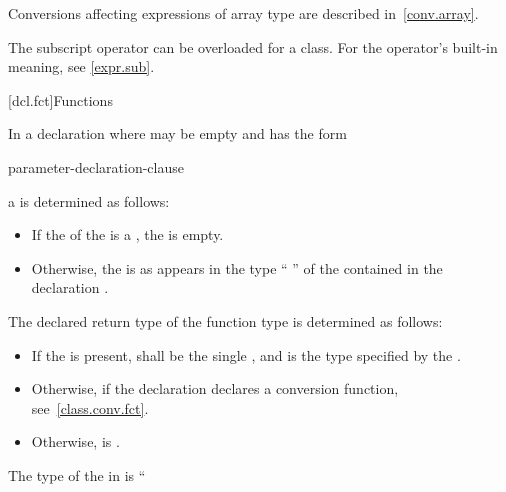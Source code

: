 \pnum
\begin{note}
Conversions affecting expressions of array type are described in~\ref{conv.array}.
\end{note}

\pnum
\begin{note}
The subscript operator can be overloaded for a class.
For the operator's built-in meaning, see \ref{expr.sub}.
\end{note}

[dcl.fct]{Functions}%

\pnum
{}%
In a declaration
where
 may be empty and
has the form
\begin{ncsimplebnf}
 \terminal{(} parameter-declaration-clause \terminal{)} \br
\bnfindent{}   
\end{ncsimplebnf}
a  is determined as follows:
\begin{itemize}
\item
If the  of the 
is a ,
the  is empty.

\item
Otherwise, the  is as appears in
the type `` ''
of the contained
in the declaration
.
\end{itemize}
The declared return type  of the function type
is determined as follows:
\begin{itemize}
\item
If the  is present,
 shall be the single  , and
 is the type specified by the .

\item
Otherwise, if the declaration declares a conversion function,
see~\ref{class.conv.fct}.

\item
Otherwise,  is .
\end{itemize}
The type of the
in
is
``
